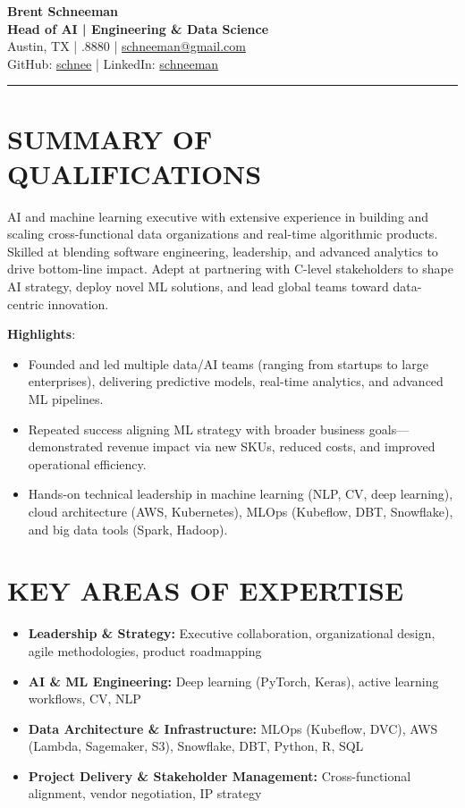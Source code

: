 \documentclass[11pt]{article}
\begin{document}
\begin{center}
{\LARGE \textbf{Brent Schneeman}}\\
\textbf{Head of AI | Engineering \& Data Science}\\[6pt]
Austin, TX \quad | .8880 \quad | \quad \href{mailto:schneeman@gmail.com}{schneeman@gmail.com}\\
GitHub: \href{https://github.com/schnee}{schnee} \quad | \quad LinkedIn: \href{https://linkedin.com/in/schneeman}{schneeman}
\end{center}

\vspace{1em}
\hrule
\vspace{1em}

\section*{SUMMARY OF QUALIFICATIONS}
AI and machine learning executive with extensive experience in building and scaling cross-functional data organizations and real-time algorithmic products. Skilled at blending software engineering, leadership, and advanced analytics to drive bottom-line impact. Adept at partnering with C-level stakeholders to shape AI strategy, deploy novel ML solutions, and lead global teams toward data-centric innovation.

\textbf{Highlights}:
\begin{itemize}[leftmargin=*]
  \item Founded and led multiple data/AI teams (ranging from startups to large enterprises), delivering predictive models, real-time analytics, and advanced ML pipelines.
  \item Repeated success aligning ML strategy with broader business goals—demonstrated revenue impact via new SKUs, reduced costs, and improved operational efficiency.
  \item Hands-on technical leadership in machine learning (NLP, CV, deep learning), cloud architecture (AWS, Kubernetes), MLOps (Kubeflow, DBT, Snowflake), and big data tools (Spark, Hadoop).
\end{itemize}

\section*{KEY AREAS OF EXPERTISE}
\begin{itemize}[leftmargin=*]
  \item \textbf{Leadership \& Strategy:} Executive collaboration, organizational design, agile methodologies, product roadmapping
  \item \textbf{AI \& ML Engineering:} Deep learning (PyTorch, Keras), active learning workflows, CV, NLP
  \item \textbf{Data Architecture \& Infrastructure:} MLOps (Kubeflow, DVC), AWS (Lambda, Sagemaker, S3), Snowflake, DBT, Python, R, SQL
  \item \textbf{Project Delivery \& Stakeholder Management:} Cross-functional alignment, vendor negotiation, IP strategy
\end{itemize}
\end{document}
